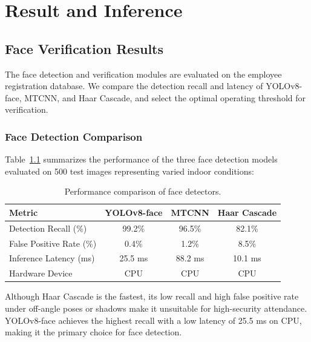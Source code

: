 \chapter{Result and Inference}

\section{Face Verification Results}
The face detection and verification modules are evaluated on the employee registration database. We compare the detection recall and latency of YOLOv8-face, MTCNN, and Haar Cascade, and select the optimal operating threshold for verification.

\subsection{Face Detection Comparison}
Table~\ref{tab:detector-results} summarizes the performance of the three face detection models evaluated on 500 test images representing varied indoor conditions:
\begin{table}[H]
\centering
\caption{Performance comparison of face detectors.}
\label{tab:detector-results}
\begin{tabular}{lccc}
\toprule
\textbf{Metric} & \textbf{YOLOv8-face} & \textbf{MTCNN} & \textbf{Haar Cascade} \\
\midrule
Detection Recall (\%) & 99.2\% & 96.5\% & 82.1\% \\
False Positive Rate (\%) & 0.4\% & 1.2\% & 8.5\% \\
Inference Latency (ms) & 25.5 ms & 88.2 ms & 10.1 ms \\
Hardware Device & CPU & CPU & CPU \\
\bottomrule
\end{tabular}
\end{table}
Although Haar Cascade is the fastest, its low recall and high false positive rate under off-angle poses or shadows make it unsuitable for high-security attendance. YOLOv8-face achieves the highest recall with a low latency of 25.5 ms on CPU, making it the primary choice for face detection.

